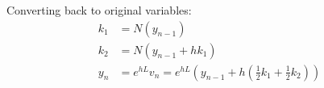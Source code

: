 \documentclass{article}
\theoremstyle{definition}
\begin{document}
Converting back to original variables:
\begin{align*}
k_1 &= N(y_{n-1})\\
k_2 &= N(y_{n-1}+hk_1)\\
y_n &= e^{hL}v_n  = e^{hL}\left(y_{n-1} + h\left(\frac{1}{2}k_1 +\frac{1}{2}k_2\right)\right)\\
\end{align*}
%
%
%
\end{document}
